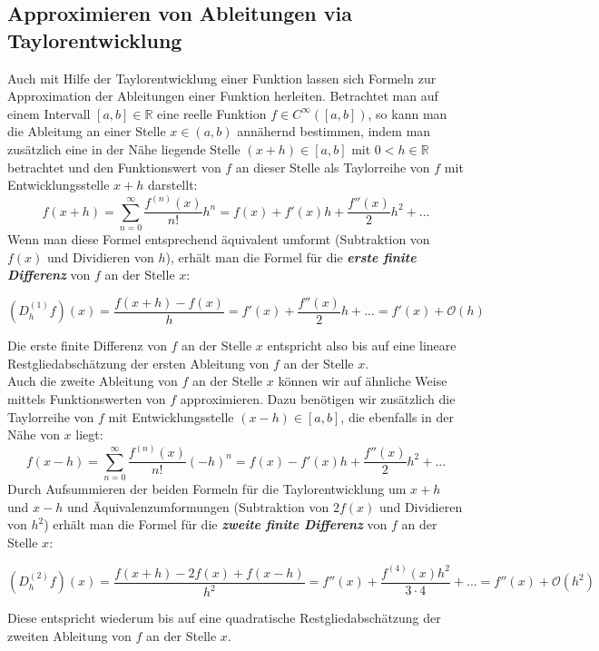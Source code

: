 \documentclass{scrartcl}
\begin{document}
\subsection{Approximieren von Ableitungen via Taylorentwicklung}
\label{ssec:herleitung2}
Auch mit Hilfe der Taylorentwicklung einer Funktion lassen sich Formeln zur Approximation der Ableitungen einer Funktion herleiten. Betrachtet man auf einem Intervall $[a,b] \in \mathbb{R}$ eine reelle Funktion $f \in C^\infty([a,b])$, so kann man die Ableitung an einer Stelle $x \in (a,b)$ annähernd bestimmen, indem man zusätzlich eine in der Nähe liegende Stelle $(x+h) \in [a,b]$ mit $0<h \in \mathbb{R}$ betrachtet und den Funktionswert von $f$ an dieser Stelle als Taylorreihe von $f$ mit Entwicklungsstelle $x+h$ darstellt:
\[f(x+h) = \sum_{n=0}^{\infty}\frac{f^{(n)}(x)}{n!}h^n = f(x)+f'(x)h+\frac{f''(x)}{2}h^2+...\]
Wenn man diese Formel entsprechend äquivalent umformt (Subtraktion von $f(x)$ und Dividieren von $h$), erhält man die Formel für die \textbf{\textit{erste finite Differenz}} von $f$ an der Stelle $x$:
\begin{shaded}
\[(D_h^{(1)}f)(x) = \frac{f(x+h)-f(x)}{h} = f'(x)+\frac{f''(x)}{2}h+...=f'(x)+\mathcal{O}(h)\;\]
\end{shaded}
Die erste finite Differenz von $f$ an der Stelle $x$ entspricht also bis auf eine lineare Restgliedabschätzung der ersten Ableitung von $f$ an der Stelle $x$. \\
Auch die zweite Ableitung von $f$ an der Stelle $x$ können wir auf ähnliche Weise mittels Funktionswerten von $f$ approximieren. Dazu benötigen wir zusätzlich die Taylorreihe von $f$ mit Entwicklungsstelle $(x-h) \in [a,b]$, die ebenfalls in der Nähe von $x$ liegt:
\[f(x-h) = \sum_{n=0}^{\infty}\frac{f^{(n)}(x)}{n!}(-h)^n = f(x)-f'(x)h+\frac{f''(x)}{2}h^2+...\]
Durch Aufsummieren der beiden Formeln für die Taylorentwicklung um $x+h$ und $x-h$ und Äquivalenzumformungen (Subtraktion von $2f(x)$ und Dividieren von $h^{2}$) erhält man die Formel für die \textbf{\textit{zweite finite Differenz}} von $f$ an der Stelle $x$:
\begin{shaded}
\[(D_h^{(2)}f)(x) = \frac{f(x+h)-2f(x)+f(x-h)}{h^2} = f''(x)+\frac{f^{(4)}(x)h^2}{3\cdot4}+...=f''(x)+\mathcal{O}(h^2)\;\]
\end{shaded}
Diese entspricht wiederum bis auf eine quadratische Restgliedabschätzung der zweiten Ableitung von $f$ an der Stelle $x$.\cite{ppi}
\end{document}
